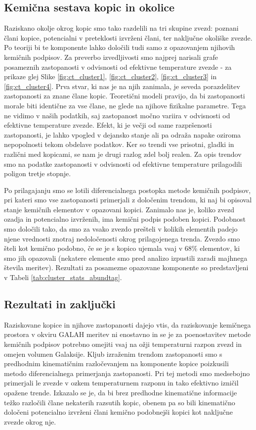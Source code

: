 \subsection{Kemična sestava kopic in okolice}
Raziskano okolje okrog kopic smo tako razdelili na tri skupine zvezd: poznani člani kopice, potencialni v preteklosti izvrženi člani, ter naključne okoliške zvezde. Po teoriji bi te komponente lahko določili tudi samo z opazovanjem njihovih kemičnih podpisov. Za preverbo izvedljivosti smo najprej narisali grafe posameznih zastopanosti v odvisnosti od efektivne temperature zvezde - za prikaze glej Slike \ref{fig:ct_cluster1}, \ref{fig:ct_cluster2}, \ref{fig:ct_cluster3} in \ref{fig:ct_cluster4}. Prva stvar, ki nas je na njih zanimala, je seveda porazdelitev zastopanosti za znane člane kopic. Teoretični modeli pravijo, da bi zastopanosti morale biti identične za vse člane, ne glede na njihove fizikalne parametre. Tega ne vidimo v naših podatkih, saj zastopanost močno variira v odvisnosti od efektivne temperature zvezde. Efekt, ki je večji od same razpršenosti zastopanosti, je lahko vpogled v dejansko stanje ali pa odraža napake oziroma nepopolnosti tekom obdelave podatkov. Ker so trendi vse prisotni, gladki in različni med kopicami, se nam je drugi razlog zdel bolj realen. Za opis trendov smo na podatke zastopanosti v odvisnosti od efektivne temperature prilagodili poligon tretje stopnje.

Po prilagajanju smo se lotili diferencialnega postopka metode kemičnih podpisov, pri kateri smo vse zastopanosti primerjali z določenim trendom, ki naj bi opisoval stanje kemičnih elementov v opazovani kopici. Zanimalo nas je, koliko zvezd ozadja in potencialno izvrženih, ima kemični podpis podoben kopici. Podobnost smo določili tako, da smo za vsako zvezdo prešteli v kolikih elementih padejo njene vrednosti znotraj nedoločenosti okrog prilagojenega trenda. Zvezdo smo šteli kot kemično podobno, če se je s kopico ujemala vsaj v $68$\% elementov, ki smo jih opazovali (nekatere elemente smo pred analizo izpustili zaradi majhnega števila meritev). Rezultati za posamezne opazovane komponente so predstavljeni v Tabeli \ref{tab:cluster_stats_abundtag}.

\subsection{Rezultati in zaključki}
Raziskovane kopice in njihove zastopanosti dajejo vtis, da raziskovanje kemičnega prostora v okviru GALAH meritev ni enostavno in se je za poenostavitev metode kemičnih podpisov potrebno omejiti vsaj na ožji temperaturni razpon zvezd in omejen volumen Galaksije. Kljub izraženim trendom zastopanosti smo s predhodnim kinematičnim razločevanjem na komponente kopice poizkusili metodo diferencialnega primerjanja zastopanosti. Pri tej metodi smo medsebojno primerjali le zvezde v ozkem temperaturnem razponu in tako efektivno izničil opažene trende. Izkazalo se je, da bi brez predhodne kinematične informacije težko razločili člane nekaterih razsutih kopic, obenem pa so bili kinematično določeni potencialno izvrženi člani kemično podobnejši kopici kot naključne zvezde okrog nje.

